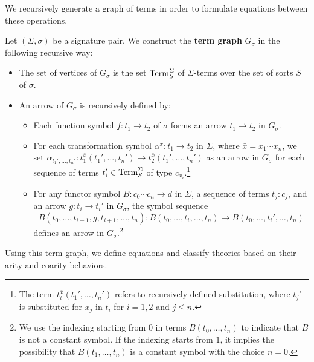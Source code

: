 We recursively generate a graph of terms in order to formulate equations between these operations.

\begin{definition}
   Let $(\Sigma,\sigma)$ be a signature pair. We construct the \textbf{term graph} $G_\sigma$ in the following recursive way:
   \begin{itemize}
       \item The set of vertices of $G_\sigma$ is the set $\mathrm{Term}^\Sigma_S$ of $\Sigma$-terms over the set of sorts $S$ of $\sigma$.
       \item An arrow of $G_\sigma$ is recursively defined by:
       \begin{itemize}
           \item Each function symbol $f \colon t_1 \to t_2$ of $\sigma$ forms an arrow $t_1 \to t_2$ in $G_\sigma$.
           \item For each transformation symbol $\alpha^{\bar{x}} \colon t_1 \to t_2$ in $\Sigma$, where $\bar{x} = x_1\cdots x_n$, we set $\alpha_{t_1',\dots, t_n'} \colon t_1^{\bar{x}}(t_1',\dots, t_n') \to t_2^{\bar{x}}(t_1',\dots, t_n')$ as an arrow in $G_\sigma$ for each sequence of terms $t_i' \in \mathrm{Term}_S^\Sigma$ of type $c_{x_i}$.\footnote{The term $t_i^{\bar{x}}(t_1',\ldots, t_n')$ refers to recursively defined substitution, where $t_j'$ is substituted for $x_j$ in $t_i$ for $i = 1,2$ and $j\leq n$.}
           \item For any functor symbol $B \colon c_0\cdots c_n \to d$ in $\Sigma$, a sequence of terms $t_j \colon c_j$, and an arrow $g \colon t_i \to t_i'$ in $G_\sigma$, the symbol sequence
           \[
           B(t_0,\dots, t_{i-1}, g, t_{i+1}, \dots, t_n) \colon B(t_0,\dots, t_i, \dots, t_n) \to B(t_0,\dots, t_i', \dots, t_n)
           \]
           defines an arrow in $G_\sigma$.\footnote{We use the indexing starting from $0$ in terms $B(t_0,\ldots, t_n)$ to indicate that $B$ is not a constant symbol. If the indexing starts from $1$, it implies the possibility that $B(t_1,\ldots, t_n)$ is a constant symbol with the choice $n = 0$.}
       \end{itemize}
   \end{itemize}
\end{definition}

Using this term graph, we define equations and classify theories based on their arity and coarity behaviors.

